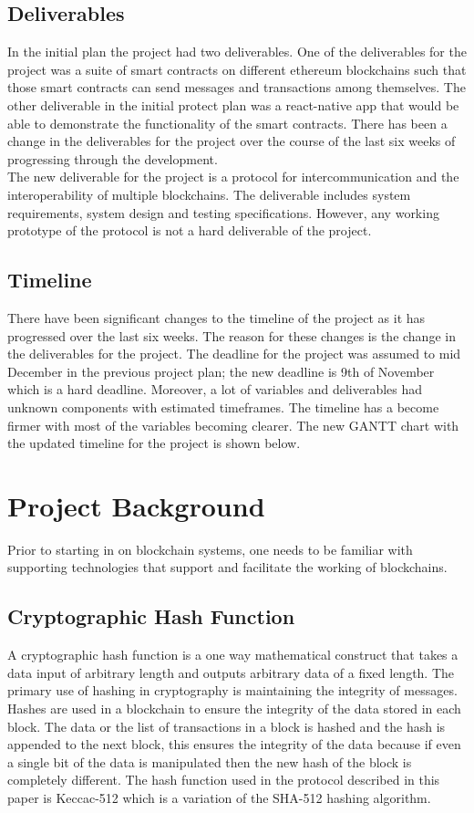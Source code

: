 \documentclass[a4paper,twoside,phd]{BYUPhys}
\begin{document}
\subsection{Deliverables}
In the initial plan the project had two deliverables. One of the deliverables for the project was a suite of smart contracts on different ethereum blockchains such that those smart contracts can send messages and transactions among themselves. The other deliverable in the initial protect plan was a react-native app that would be able to demonstrate the functionality of the smart contracts. There has been a change in the deliverables for the project over the course of the last six weeks of progressing through the development. 
\\

The new deliverable for the project is a protocol for intercommunication and the interoperability of multiple blockchains. The deliverable includes system requirements, system design and testing specifications. However, any working prototype of the protocol is not a hard deliverable of the project.
\subsection{Timeline}
There have been significant changes to the timeline of the project as it has progressed over the last six weeks. The reason for these changes is the change in the deliverables for the project. The deadline for the project was assumed to mid December in the previous project plan; the new deadline is 9th of November which is a hard deadline. Moreover, a lot of variables and deliverables had unknown components with estimated timeframes. The timeline has a become firmer with most of the variables becoming clearer. The new GANTT chart with the updated timeline for the project is shown below.
\section{Project Background}
Prior to starting in on blockchain systems, one needs to be familiar with supporting technologies that support and facilitate the working of blockchains. 
\subsection{Cryptographic Hash Function}
A cryptographic hash function is a one way mathematical construct that takes a data input of arbitrary length and outputs arbitrary data of a fixed length. The primary use of hashing in cryptography is maintaining the integrity of messages. Hashes are used in a blockchain to ensure the integrity of the data stored in each block. The data or the list of transactions in a block is hashed and the hash is appended to the next block, this ensures the integrity of the data because if even a single bit of the data is manipulated then the new hash of the block is completely different. The hash function used in the protocol described in this paper is Keccac-512 which is a variation of the SHA-512 hashing algorithm. 
\end{document}

